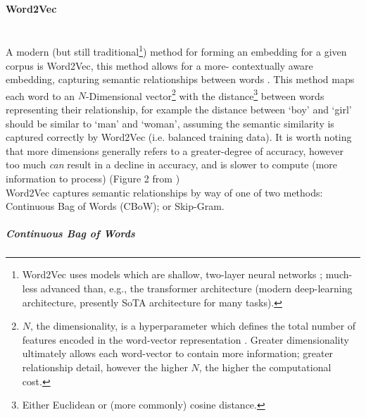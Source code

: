 \paragraph{Word2Vec}
\label{para:word2vec}
\noindent\\
A modern (but still traditional\footnote{Word2Vec uses models which are shallow, two-layer neural networks \citep{wikipedia:word2vec}; much-less advanced than, e.g., the transformer architecture (modern deep-learning architecture, presently SoTA architecture for many tasks).}) method for forming an embedding for a given corpus is Word2Vec, this method allows for a more- contextually aware embedding, capturing semantic relationships between words \citep{geeks:word2vec}. This method maps each word to an $N$-Dimensional vector\footnote{$N$, the dimensionality, is a hyperparameter which defines the total number of features encoded in the word-vector representation \citep{baeldung:dimensionality}. Greater dimensionality ultimately allows each word-vector to contain more information; greater relationship detail, however the higher $N$, the higher the computational cost.} with the distance\footnote{Either Euclidean or (more commonly) cosine distance.} between words representing their relationship, for example the distance between `boy' and `girl' should be similar to `man' and `woman', assuming the semantic similarity is captured correctly by Word2Vec (i.e. balanced training data). It is worth noting that more dimensions generally refers to a greater-degree of accuracy, however too much \textit{can} result in a decline in accuracy, and is slower to compute (more information to process) (Figure 2 from \cite{aclanthology:dimensionality_vs_accuracy})\\
Word2Vec captures semantic relationships by way of one of two methods: Continuous Bag of Words (CBoW); or Skip-Gram.
\subparagraph{Continuous Bag of Words}
\label{subpara:cbow}
\noindent

